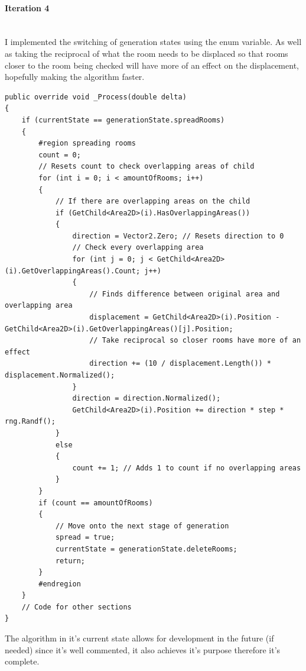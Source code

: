 \documentclass{article}
\newcommand{\myparagraph}[1]{\paragraph{#1}\mbox{}\\} %
\begin{document}
\myparagraph{Iteration 4}
I implemented the switching of generation states using the enum variable. As well as taking the reciprocal of what the room needs to be displaced so that rooms closer to the room being checked will have more of an effect on the displacement, hopefully making the algorithm faster.
\begin{lstlisting}
public override void _Process(double delta)
{
    if (currentState == generationState.spreadRooms)
    {
        #region spreading rooms
        count = 0; 
        // Resets count to check overlapping areas of child
        for (int i = 0; i < amountOfRooms; i++)
        {
            // If there are overlapping areas on the child
            if (GetChild<Area2D>(i).HasOverlappingAreas()) 
            {
                direction = Vector2.Zero; // Resets direction to 0
                // Check every overlapping area
                for (int j = 0; j < GetChild<Area2D>(i).GetOverlappingAreas().Count; j++) 
                {
                    // Finds difference between original area and overlapping area
                    displacement = GetChild<Area2D>(i).Position - GetChild<Area2D>(i).GetOverlappingAreas()[j].Position;
                    // Take reciprocal so closer rooms have more of an effect
                    direction += (10 / displacement.Length()) * displacement.Normalized(); 
                }
                direction = direction.Normalized();
                GetChild<Area2D>(i).Position += direction * step * rng.Randf();
            }
            else
            {
                count += 1; // Adds 1 to count if no overlapping areas
            }
        }
        if (count == amountOfRooms)
        {
            // Move onto the next stage of generation
            spread = true;
            currentState = generationState.deleteRooms;
            return;
        }
        #endregion
    }
    // Code for other sections
}

\end{lstlisting}
The algorithm in it's current state allows for development in the future (if needed) since it's well commented, it also achieves it's purpose therefore it's complete. 
\end{document}

